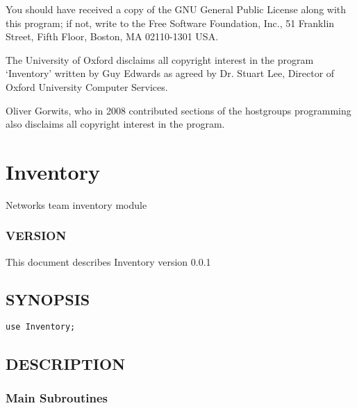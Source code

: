 \documentclass{book}
\begin{document}
You should have received a copy of the GNU General Public License along with this program; if not, write to the Free Software Foundation, Inc., 51 Franklin Street, Fifth Floor, Boston, MA 02110-1301 USA.



The University of Oxford disclaims all copyright interest in the program `Inventory' written by Guy Edwards as agreed by Dr. Stuart Lee, Director of Oxford University Computer Services.



Oliver Gorwits, who in 2008 contributed sections of the hostgroups programming also disclaims all copyright interest in the program.




\section{Inventory}
\label{_Inventory}
\hypertarget{_Inventory}{}



Networks team inventory module


\subsubsection{VERSION}
\label{Inventory_VERSION}
\hypertarget{Inventory_VERSION}{}



This document describes Inventory version 0.0.1


\subsection{SYNOPSIS}
\label{Inventory_SYNOPSIS}
\hypertarget{Inventory_SYNOPSIS}{}


\begin{Verbatim}[fontfamily=courier,gobble=1,frame=lines,fontsize=\small]
  use Inventory;
\end{Verbatim}


\subsection{DESCRIPTION}
\label{Inventory_DESCRIPTION}
\hypertarget{Inventory_DESCRIPTION}{}


\subsubsection{Main Subroutines}
\label{Inventory_Main_Subroutines}
\hypertarget{Inventory_Main_Subroutines}{}
\end{document}
